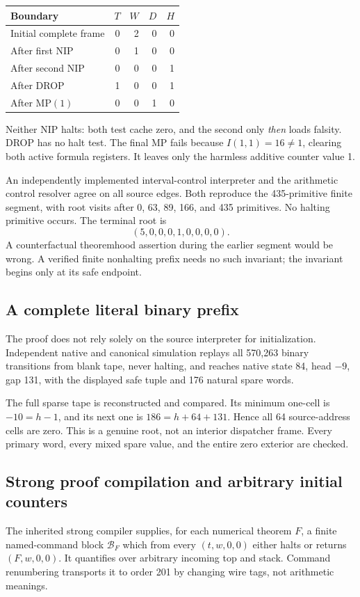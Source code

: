 \begin{center}\small
\begin{tabular}{lrrrr}\toprule
Boundary & $T$&$W$&$D$&$H$\\\midrule
Initial complete frame&0&2&0&0\\
After first NIP&0&1&0&0\\
After second NIP&0&0&0&1\\
After DROP&1&0&0&1\\
After MP$(1)$&0&0&1&0\\\bottomrule
\end{tabular}
\end{center}
Neither NIP halts: both test cache zero, and the second only \emph{then} loads falsity. DROP has no halt test. The final MP fails because $I(1,1)=16\ne1$, clearing both active formula registers. It leaves only the harmless additive counter value 1.

An independently implemented interval-control interpreter and the arithmetic control resolver agree on all source edges. Both reproduce the 435-primitive finite segment, with root visits after 0, 63, 89, 166, and 435 primitives. No halting primitive occurs. The terminal root is
\[
                         (5,0,0,0,1,0,0,0,0).
\]
A counterfactual theoremhood assertion during the earlier segment would be wrong. A verified finite nonhalting prefix needs no such invariant; the invariant begins only at its safe endpoint.

\subsection{A complete literal binary prefix}
The proof does not rely solely on the source interpreter for initialization. Independent native and canonical simulation replays all 570,263 binary transitions from blank tape, never halting, and reaches native state 84, head $-9$, gap 131, with the displayed safe tuple and 176 natural spare words.

The full sparse tape is reconstructed and compared. Its minimum one-cell is $-10=h-1$, and its next one is $186=h+64+131$. Hence all 64 source-address cells are zero. This is a genuine root, not an interior dispatcher frame. Every primary word, every mixed spare value, and the entire zero exterior are checked.

\subsection{Strong proof compilation and arbitrary initial counters}
The inherited strong compiler supplies, for each numerical theorem $F$, a finite named-command block $\mathcal B_F$ which from every $(t,w,0,0)$ either halts or returns $(F,w,0,0)$. It quantifies over arbitrary incoming top and stack. Command renumbering transports it to order 201 by changing wire tags, not arithmetic meanings.

